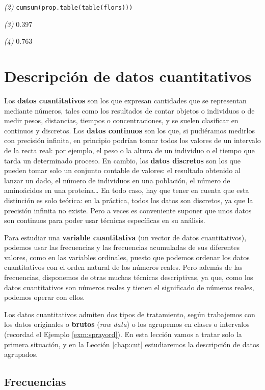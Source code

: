 \documentclass[]{book}
\theoremstyle{definition}
\theoremstyle{definition}
\theoremstyle{definition}
\theoremstyle{remark}
\begin{document}
\emph{(2)} \texttt{cumsum(prop.table(table(flors)))}

\emph{(3)} 0.397

\emph{(4)} 0.763

\hypertarget{chap:quan}{%
\chapter{Descripción de datos cuantitativos}\label{chap:quan}}

Los \textbf{datos cuantitativos} son los que expresan cantidades que se representan mediante números, tales como los resultados de contar objetos o individuos o de medir pesos, distancias, tiempos o concentraciones, y se suelen clasificar en continuos y discretos.
Los \textbf{datos continuos} son los que, si pudiéramos medirlos con precisión infinita, en principio podrían tomar todos los valores de un intervalo de la recta real: por ejemplo, el peso o la altura de un individuo o el tiempo que tarda un determinado proceso.
En cambio, los \textbf{datos discretos} son los que pueden tomar solo un conjunto contable de valores: el resultado obtenido al lanzar un dado, el número de individuos en una población, el número de aminoácidos en una proteína\ldots{} En todo caso, hay que tener en cuenta que esta distinción es solo teórica: en la práctica, todos los datos son discretos, ya que la precisión infinita no existe. Pero a veces es conveniente suponer que unos datos son continuos para poder usar técnicas específicas en su análisis.

Para estudiar una \textbf{variable cuantitativa} (un vector de datos cuantitativos), podemos usar las frecuencias y las frecuencias acumuladas de sus diferentes valores,
como en las variables ordinales, puesto que podemos ordenar los datos cuantitativos con el orden natural de los números reales. Pero además de las frecuencias, disponemos de otras muchas técnicas descriptivas, ya que, como los datos cuantitativos son números reales y tienen el significado de números reales, podemos operar con ellos.

Los datos cuantitativos admiten dos tipos de tratamiento, según trabajemos con los datos originales o \textbf{brutos} (\emph{raw data}) o los agrupemos en clases o intervalos (recordad el Ejemplo \ref{exm:sprayord}). En esta lección vamos a tratar solo la primera situación, y en la Lección \ref{chap:cut} estudiaremos la descripción de datos agrupados.

\hypertarget{sec:quan}{%
\section{Frecuencias}\label{sec:quan}}
\end{document}
